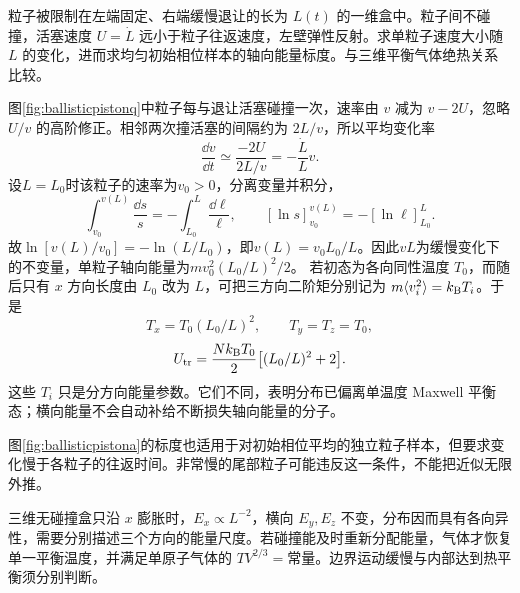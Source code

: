 \begin{example}[一维无碰撞气体的缓慢活塞膨胀]
粒子被限制在左端固定、右端缓慢退让的长为 $L(t)$ 的一维盒中。粒子间不碰撞，活塞速度 $U=\dot L$ 远小于粒子往返速度，左壁弹性反射。求单粒子速度大小随 $L$ 的变化，进而求均匀初始相位样本的轴向能量标度。与三维平衡气体绝热关系比较。
\end{example}
\begin{solution}
图\ref{fig:ballisticpistonq}中粒子每与退让活塞碰撞一次，速率由 $v$ 减为 $v-2U$，忽略 $U/v$ 的高阶修正。相邻两次撞活塞的间隔约为 $2L/v$，所以平均变化率
\[
 \frac{\dd v}{\dd t}\simeq\frac{-2U}{2L/v}=-\frac{\dot L}L v.
\]
设$L=L_0$时该粒子的速率为$v_0>0$，分离变量并积分，
\[\int_{v_0}^{v(L)}\frac{\dd s}{s}=-\int_{L_0}^{L}\frac{\dd\ell}{\ell},
\qquad[\ln s]_{v_0}^{v(L)}=-[\ln\ell]_{L_0}^{L}.\]
故$\ln[v(L)/v_0]=-\ln(L/L_0)$，即$v(L)=v_0L_0/L$。因此$vL$为缓慢变化下的不变量，单粒子轴向能量为$mv_0^2(L_0/L)^2/2$。
若初态为各向同性温度 $T_0$，而随后只有 $x$ 方向长度由 $L_0$ 改为 $L$，可把三方向二阶矩分别记为 $m\langle v_i^2\rangle=k_{\mathrm B} T_i$。于是
\[
 T_x=T_0(L_0/L)^2,\qquad T_y=T_z=T_0,
\]
\[
 U_{\rm tr}=\frac{Nk_{\mathrm B} T_0}{2}\bigl[(L_0/L)^2+2\bigr].
\]
这些 $T_i$ 只是分方向能量参数。它们不同，表明分布已偏离单温度 Maxwell 平衡态；横向能量不会自动补给不断损失轴向能量的分子。

图\ref{fig:ballisticpistona}的标度也适用于对初始相位平均的独立粒子样本，但要求变化慢于各粒子的往返时间。非常慢的尾部粒子可能违反这一条件，不能把近似无限外推。

三维无碰撞盒只沿 $x$ 膨胀时，$E_x\propto L^{-2}$，横向 $E_y,E_z$ 不变，分布因而具有各向异性，需要分别描述三个方向的能量尺度。若碰撞能及时重新分配能量，气体才恢复单一平衡温度，并满足单原子气体的 $TV^{2/3}=\text{常量}$。边界运动缓慢与内部达到热平衡须分别判断。
\end{solution}

